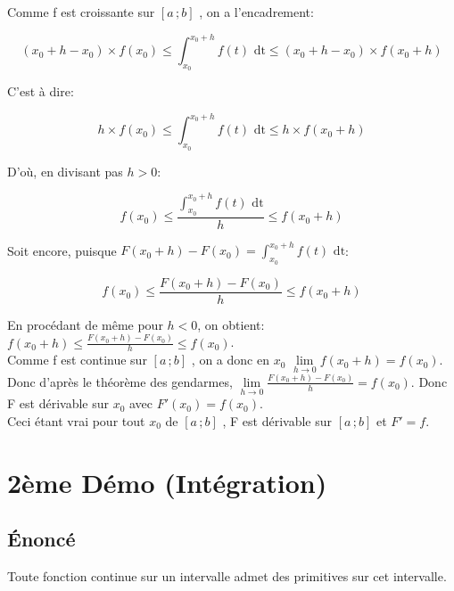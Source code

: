 \documentclass[12px]{article}
\newcommand\I{$[a\,;b]$ }
\newcommand\xo{x_{0} }
\newcommand\dt{f(t)\,\,\mathrm{dt}}
\begin{document}
	Comme f est croissante sur \I, on a l'encadrement:
	\begin{center}
		\begin{displaymath}
			(\xo +h -\xo ) \times f(\xo) 
				\leq 
			\int_{\xo}^{\xo +h}\dt 
				\leq 
			(\xo +h -\xo) \times f(\xo +h)
		\end{displaymath}
	\end{center}
	C'est à dire:
	\begin{center}
		\begin{displaymath}
			h \times f(\xo) 
			\leq 
			\int_{\xo}^{\xo +h}\dt 
			\leq 
			h \times f(\xo +h)
		\end{displaymath}
	\end{center}
	D'où, en divisant pas $h>0$:
	\begin{center}
		\begin{displaymath}
			f(\xo) \leq \frac{\int_{\xo}^{\xo +h}\dt}{h} \leq f(\xo +h)
		\end{displaymath}
	\end{center}
	Soit encore, puisque $F(\xo +h) - F(\xo) = \int_{\xo}^{\xo +h}\dt$:
	\begin{center}
		\begin{displaymath}
			f(\xo) \leq \frac{F(\xo +h) - F(\xo)}{h} \leq f(\xo +h)
		\end{displaymath}
	\end{center}
	En procédant de même pour $h<0$, on obtient:
	$f(\xo +h) \leq \frac{F(\xo +h) - F(\xo)}{h} \leq f(\xo)$.\\
	Comme f est continue sur \I, on a donc en $\xo$ 
	$\lim\limits_{h \rightarrow 0} f(\xo +h) = f(\xo)$.\\
	Donc d'après le théorème des gendarmes, 
	$\lim\limits_{h \rightarrow 0}\frac{F(\xo +h) - F(\xo)}{h} = f(\xo)$.
	Donc F est dérivable sur $\xo$ avec $F'(\xo) = f(\xo)$.\\
	Ceci étant vrai pour tout $\xo$ de \I, F est dérivable sur \I et $F'=f$.
	
	
	\section{2ème Démo (Intégration)}
	
	\subsection{\'Enoncé}
	Toute fonction continue sur un intervalle admet des primitives sur cet intervalle.
	
\end{document}
